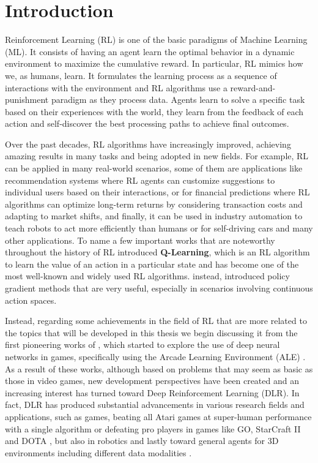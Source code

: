 
\chapter{Introduction}
\label{sec:introduction}
Reinforcement Learning (RL) \citep{sutton1998introduction} is one of the basic paradigms of Machine Learning (ML). It consists of having an agent learn the optimal behavior in a dynamic environment to maximize the cumulative reward.
In particular, RL mimics how we, as humans, learn.
It formulates the learning process as a sequence of interactions with the environment and RL algorithms use a reward-and-punishment paradigm as they process data.
Agents learn to solve a specific task based on their experiences with the world, they learn from the feedback of each action and self-discover the best processing paths to achieve final outcomes.

Over the past decades, RL algorithms have increasingly improved, achieving amazing results in many tasks and being adopted in new fields.
For example, RL can be applied in many real-world scenarios, some of them are applications like recommendation systems where RL agents can customize suggestions to individual users based on their interactions, or for financial predictions where RL algorithms can optimize long-term returns by considering transaction costs and adapting to market shifts, and finally, it can be used in industry automation to teach robots to act more efficiently than humans or for self-driving cars and many other applications.
To name a few important works that are noteworthy throughout the history of RL \citet{watkins1992q} introduced \textbf{Q-Learning}, which is an RL algorithm to learn the value of an action in a particular state and has become one of the most well-known and widely used RL algorithms.
\citep{sutton1999policy} instead, introduced policy gradient methods that are very useful, especially in scenarios involving continuous action spaces.

Instead, regarding some achievements in the field of RL that are more related to the topics that will be developed in this thesis we begin discussing it from the first pioneering works of \citet{mnih2013playing, mnih2015human}, which started to explore the use of deep neural networks in games, specifically using the Arcade Learning Environment (ALE) \citep{bellemare2013atari}.
As a result of these works, although based on problems that may seem as basic as those in video games, new development perspectives have been created and an increasing interest has turned toward Deep Reinforcement Learning (DLR).
In fact, DLR has produced substantial advancements in various research fields and applications, such as games, beating all Atari games at super-human performance with a single algorithm \citep{agent57} or defeating pro players in games like GO, StarCraft II and DOTA \citep{alphago, starcraft, dota}, but also in robotics \citep{rlrob, bousmalis2023robocat} and lastly toward general agents for 3D environments including different data modalities \citep{sima2024}.

